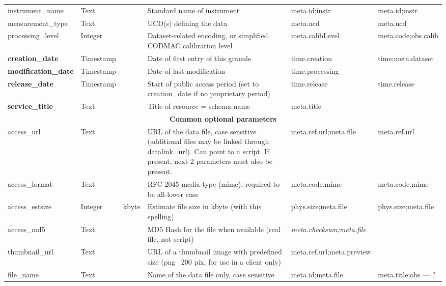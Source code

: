 \documentclass[11pt,a4paper]{ivoa}
\begin{document}
\begin{landscape}
\begin{longtable}{p{3.5cm}p{0.5cm}p{1.4cm}p{1cm}p{7cm}p{5cm}}
instrument\_name&Text&&Standard name of instrument&meta.id;instr&meta.id;instr\\

measurement\_type&Text&&UCD(s) defining the data&meta.ucd&meta.ucd\\

processing\_level&Integer&&Dataset-related encoding, or simplified CODMAC calibration level&meta.calibLevel&meta.code;obs.calib\\

\textbf{creation\_date}&Timestamp&&Date of first entry of this granule&time.creation&time;meta.dataset\\

\textbf{modification\_date}&Timestamp&&Date of last modification&time.processing&\\

\textbf{release\_date}&Timestamp&&Start of public access period (set to creation\_date if no proprietary period)&time.release&time.release\\

\textbf{service\_title}&Text&&Title of resource = schema name&meta.title&\\

\multicolumn{6}{c}{\vrule width 0pt height 20pt depth 12pt \textbf{\textbf{Common optional parameters}}}\\

access\_url&Text&&URL of the data file, case sensitive (additional files may be linked through datalink\_url). Can point to a script. If present, next 2 parameters must also be present.&meta.ref.url;meta.file&meta.ref.url\\

access\_format&Text&&RFC 2045 media type (mime), required to be all-lower case &meta.code.mime&meta.code.mime\\

access\_estsize&Integer&kbyte&Estimate file size in kbyte (with this spelling)&phys.size;meta.file&phys.size;meta.file\\

access\_md5&Text&&MD5 Hash for the file when available (real file, not script)&\emph{ meta.checksum;meta.file}&\\

thumbnail\_url&Text&&URL of a thumbnail image with predefined size (png ~200 pix, for use in a client only)&meta.ref.url;meta.preview&\\

file\_name&Text&&Name of the data file only, case sensitive&meta.id;meta.file&meta.title;obs — ?\\


\end{longtable}
\end{landscape}
\end{document}
